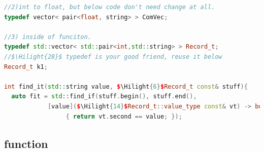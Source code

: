 \documentclass[a4paper,12pt,twoside]{book}
\newcommand{\Hilight}[1]{\makebox[0pt][l]{\color{yellow}\rule[-3pt]{#1em}{11pt}}}
\begin{document}
\begin{itemize}
\begin{lstlisting}[frame=single, language=c++, mathescape=true]
//2)int to float, but below code don't need change at all.
typedef vector< pair<float, string> > ComVec;

//3) inside of funciton.
typedef std::vector< std::pair<int,std::string> > Record_t;
//$\Hilight{28}$ typedef is your good friend, reuse it below
Record_t k1;

int find_it(std::string value, $\Hilight{6}$Record_t const& stuff){
  auto fit = std::find_if(stuff.begin(), stuff.end(),
            [value]($\Hilight{14}$Record_t::value_type const& vt) -> bool
                 { return vt.second == value; });
\end{lstlisting}

\end{itemize}

\subsection{function}
\end{document}
